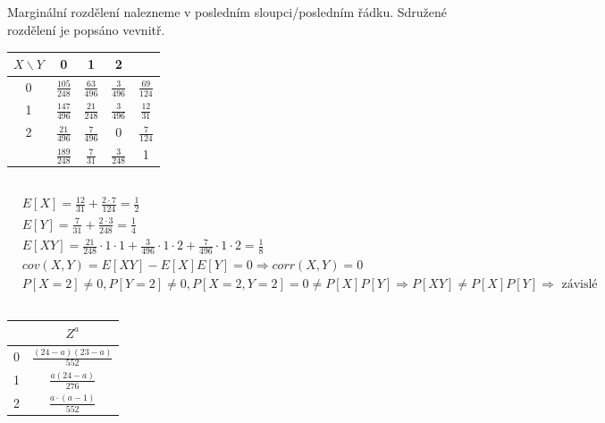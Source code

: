\documentclass[a4paper]{article}
\begin{document}
\subsection{}
Marginální rozdělení nalezneme v posledním sloupci/posledním řádku. Sdružené rozdělení je popsáno vevnitř.
\begin{center}
\begin{tabular}{| c | c | c | c | c | }\hline
	$X\backslash Y$ & 0 & 1 & 2 & \\ \hline
	0 & $\frac{105}{248}$ & $\frac{63}{496}$ & $\frac{3}{496}$ & $\frac{69}{124}$ \\ \hline
	1 & $\frac{147}{496}$ & $\frac{21}{248}$ & $\frac{3}{496}$ & $\frac{12}{31}$ \\ \hline
	2 & $\frac{21}{496}$  & $\frac{7}{496}$  & $0$ 			   & $\frac{7}{124}$\\ \hline
	  & $\frac{189}{248}$ & $\frac{7}{31}$ 	 & $\frac{3}{248}$ & 1\\ \hline
\end{tabular}
\end{center}

\subsection{}
\begin{align*}
	& E[X] = \frac{12}{31} + \frac{2\cdot 7}{124} = \frac{1}{2} \\
	& E[Y] = \frac{7}{31} + \frac{2\cdot 3}{248} = \frac{1}{4} \\
	& E[XY] = \frac{21}{248} \cdot 1 \cdot 1 + \frac{3}{496} \cdot 1 \cdot 2 + \frac{7}{496} \cdot 1 \cdot 2 = \frac{1}{8} \\
	& cov(X,Y) = E[XY] - E[X]E[Y] = 0 \Rightarrow corr(X,Y) = 0 \\ 
	& P[X=2] \ne 0, P[Y=2] \ne 0, P[X=2,Y=2] = 0 \ne P[X]P[Y] \Rightarrow P[XY] \ne P[X]P[Y] \Rightarrow \text{ závislé}
\end{align*}

\subsection{}
\begin{center}
\begin{tabular}{| c | c | }\hline
	  & $Z^a$  \\ \hline
	0 & $\frac{(24-a)(23-a)}{552}$  \\ \hline
	1 & $\frac{a(24-a)}{276}$  \\ \hline
	2 & $\frac{a\cdot(a-1)}{552}$  \\ \hline
\end{tabular}
\end{center}
\end{document}
